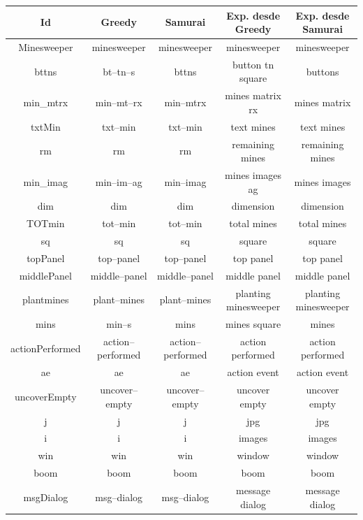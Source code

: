 \begin{table}
\begin{tabular}{| c | c | c | c | c |}
       \hline
  	   \textbf{Id} & \textbf{Greedy} & \textbf{Samurai} & \textbf{Exp. desde Greedy} & \textbf{Exp. desde Samurai} \\ \hline
Minesweeper&minesweeper&minesweeper&minesweeper&minesweeper\\ \hline
bttns&bt--tn--s&bttns&button tn square&buttons\\ \hline
min\_mtrx&min--mt--rx&min--mtrx&mines matrix rx&mines matrix\\ \hline
txtMin&txt--min&txt--min&text mines&text mines\\ \hline
rm&rm&rm&remaining mines&remaining mines\\ \hline
min\_imag&min--im--ag&min--imag&mines images ag&mines images\\ \hline
dim&dim&dim&dimension&dimension\\ \hline
TOTmin&tot--min&tot--min&total mines&total mines\\ \hline
sq&sq&sq&square&square\\ \hline
topPanel&top--panel&top--panel&top panel&top panel\\ \hline
middlePanel&middle--panel&middle--panel&middle panel&middle panel\\ \hline
plantmines&plant--mines&plant--mines&planting minesweeper&planting minesweeper\\ \hline
mins&min--s&mins&mines square&mines\\ \hline
actionPerformed&action--performed&action--performed&action performed&action performed\\ \hline
ae&ae&ae&action event&action event\\ \hline
uncoverEmpty&uncover--empty&uncover--empty&uncover empty&uncover empty\\ \hline
j&j&j&jpg&jpg\\ \hline
i&i&i&images&images\\ \hline
win&win&win&window&window\\ \hline
boom&boom&boom&boom&boom\\ \hline
msgDialog&msg--dialog&msg--dialog&message dialog&message dialog\\ \hline

\end{tabular}
\end{table}
